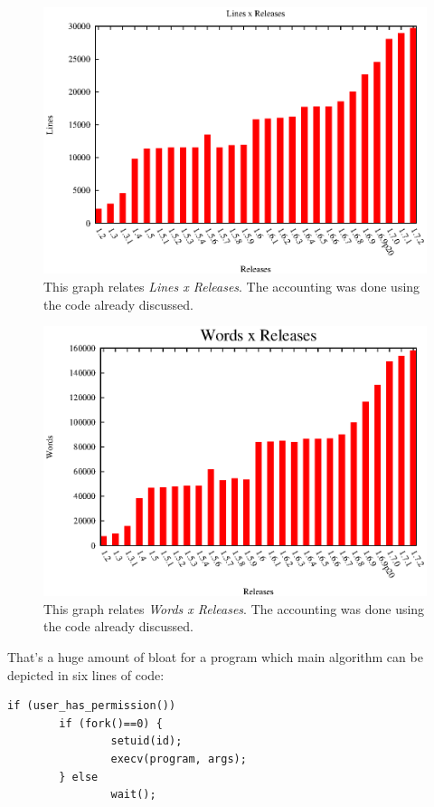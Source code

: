 \documentclass{article}
\begin{document}
\begin{figure}
\centering
\includegraphics[scale=0.7]{lines}
\caption{This graph relates \emph{Lines x Releases}. The accounting was done using
the code already discussed.}\label{fig:hugelines}
\end{figure}
\begin{figure}
\centering
\includegraphics[scale=0.7]{words}
\caption{This graph relates \emph{Words x Releases}. The accounting was done
using the code already discussed.}\label{fig:hugewords}
\end{figure}

That's a huge amount of bloat for a program which main algorithm can be depicted in
six lines of code:
\begin{verbatim}
if (user_has_permission())
        if (fork()==0) {
                setuid(id);
                execv(program, args);
        } else
                wait();
\end{verbatim}
\end{document}
